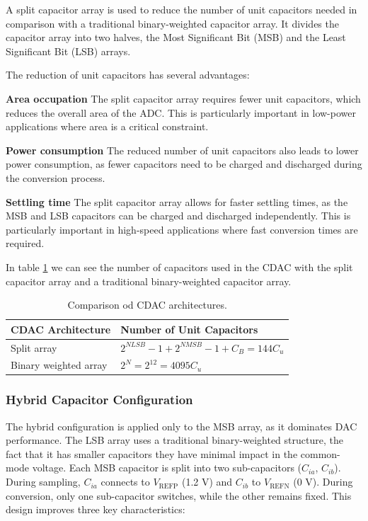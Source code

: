 A split capacitor array is used to reduce the number of unit capacitors needed in comparison with a traditional binary-weighted capacitor array. It divides the capacitor array into two halves, the Most Significant Bit (MSB) and the Least Significant Bit (LSB) arrays. 

The reduction of unit capacitors has several advantages:

\textbf{Area occupation}
The split capacitor array requires fewer unit capacitors, which reduces the overall area of the ADC. This is particularly important in low-power applications where area is a critical constraint.

\textbf{Power consumption}
The reduced number of unit capacitors also leads to lower power consumption, as fewer capacitors need to be charged and discharged during the conversion process.

\textbf{Settling time}
The split capacitor array allows for faster settling times, as the MSB and LSB capacitors can be charged and discharged independently. This is particularly important in high-speed applications where fast conversion times are required.

In table \ref{tab:cap-numbers} we can see the number of capacitors used in the CDAC with the split capacitor array and a traditional binary-weighted capacitor array.

\begin{table}[h]
    \centering
    \caption{Comparison od CDAC architectures.}
    \begin{tabularx}{\textwidth}{>{\centering\arraybackslash}X >{\centering\arraybackslash}X}
        \toprule
        \textbf{CDAC Architecture} & \textbf{Number of Unit Capacitors} \\
        \midrule
        Split array & $2^{NLSB} -1 + 2^{NMSB} - 1 + C_B = 144C_u$\\
        \midrule
        Binary weighted array & $2^N = 2^{12} = 4095C_u$ \\
        \bottomrule
    \end{tabularx}
    \label{tab:cap-numbers}
\end{table}

\subsubsection{Hybrid Capacitor Configuration}  
The hybrid configuration is applied only to the MSB array, as it dominates DAC performance. The LSB array uses a traditional binary-weighted structure, the fact that it has smaller capacitors they have minimal impact in the common-mode voltage. Each MSB capacitor is split into two sub-capacitors ($C_{ia}$, $C_{ib}$). During sampling, $C_{ia}$ connects to $V_{\text{REFP}}$ (1.2 V) and $C_{ib}$ to $V_{\text{REFN}}$ (0 V). During conversion, only one sub-capacitor switches, while the other remains fixed. This design improves three key characteristics:  


